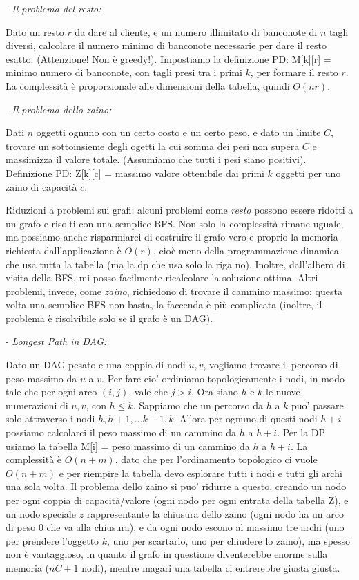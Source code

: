\documentclass[a4paper,10pt]{article} %
\begin{document}
- \emph{Il problema del resto:} \par
Dato un resto $r$ da dare al cliente, e un numero illimitato di banconote di $n$ tagli diversi, calcolare il numero minimo di banconote necessarie per dare il resto esatto. (Attenzione! Non è greedy!). Impostiamo la definizione PD: M[k][r] = minimo numero di banconote, con tagli presi tra i primi $k$, per formare il resto $r$. La complessità è proporzionale alle dimensioni della tabella, quindi $O(nr)$.
\medskip

- \emph{Il problema dello zaino:} \par
Dati $n$ oggetti ognuno con un certo costo e un certo peso, e dato un limite $C$, trovare un sottoinsieme degli ogetti la cui somma dei pesi non supera $C$ e massimizza il valore totale. (Assumiamo che tutti i pesi siano positivi). Definizione PD: Z[k][c] = massimo valore ottenibile dai primi $k$ oggetti per uno zaino di capacità $c$.
\medskip

Riduzioni a problemi sui grafi: alcuni problemi come \emph{resto} possono essere ridotti a un grafo e risolti con una semplice BFS. Non solo la complessità rimane uguale, ma possiamo anche risparmiarci di costruire il grafo vero e proprio la memoria richiesta dall'applicazione è $O(r)$, cioè meno della programmazione dinamica che usa tutta la tabella (ma la dp che usa solo la riga no). Inoltre, dall'albero di visita della BFS, mi posso facilmente ricalcolare la soluzione ottima. Altri problemi, invece, come \emph{zaino}, richiedono di trovare il cammino massimo; questa volta una semplice BFS non basta, la faccenda è più complicata (inoltre, il problema è risolvibile solo se il grafo è un DAG).
\medskip

- \emph {Longest Path in DAG:} \par
Dato un DAG pesato e una coppia di nodi $u, v$, vogliamo trovare il percorso di peso massimo da $u$ a $v$. Per fare cio' ordiniamo topologicamente i nodi, in modo tale che per ogni arco $(i, j)$, vale che $j > i$. Ora siano $h$ e $k$ le nuove numerazioni di $u, v$, con $h \leq k$. Sappiamo che un percorso da $h$ a $k$ puo' passare solo attraverso i nodi $h, h + 1, \ldots k - 1, k$. Allora per ognuno di questi nodi $h + i$ possiamo calcolarci il peso massimo di un cammino da $h$ a $h + i$. Per la DP usiamo la tabella M[i] = peso massimo di un cammino da $h$ a $h + i$. La complessità è $O(n + m)$, dato che per l'ordinamento topologico ci vuole $O(n + m)$ e per riempire la tabella devo esplorare tutti i nodi e tutti gli archi una sola volta. Il problema dello zaino si puo' ridurre a questo, creando un nodo per ogni coppia di capacità/valore (ogni nodo per ogni entrata della tabella Z), e un nodo speciale $z$ rappresentante la chiusura dello zaino (ogni nodo ha un arco di peso 0 che va alla chiusura), e da ogni nodo escono al massimo tre archi (uno per prendere l'oggetto $k$, uno per scartarlo, uno per chiudere lo zaino), ma spesso non è vantaggioso, in quanto il grafo in questione diventerebbe enorme sulla memoria ($nC + 1$ nodi), mentre magari una tabella ci entrerebbe giusta giusta.
\medskip
\end{document}
